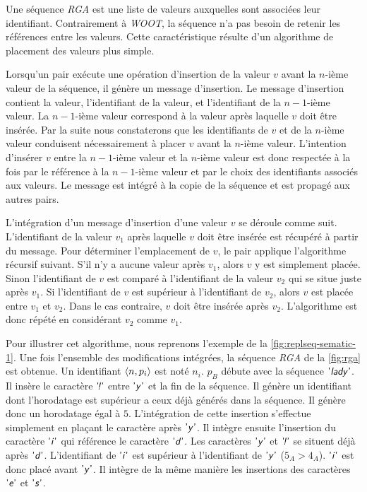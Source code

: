 Une séquence \emph{RGA} est une liste de valeurs auxquelles sont associées leur identifiant.
Contrairement à \emph{WOOT}, la séquence n'a pas besoin de retenir les références entre les valeurs.
Cette caractéristique résulte d'un algorithme de placement des valeurs plus simple.

Lorsqu'un pair exécute une opération d'insertion de la valeur $v$ avant la $n$-ième valeur de la séquence, il génère un message d'insertion.
Le message d'insertion contient la valeur, l'identifiant de la valeur, et l'identifiant de la $n-1$-ième valeur.
La $n-1$-ième valeur correspond à la valeur après laquelle $v$ doit être insérée.
Par la suite nous constaterons que les identifiants de $v$ et de la $n$-ième valeur conduisent nécessairement à placer $v$ avant la $n$-ième valeur.
L'intention d'insérer $v$ entre la $n-1$-ième valeur et la $n$-ième valeur est donc respectée à la fois par le référence à la $n-1$-ième valeur et par le choix des identifiants associés aux valeurs.
Le message est intégré à la copie de la séquence et est propagé aux autres pairs.

L'intégration d'un message d'insertion d'une valeur $v$ se déroule comme suit.
L'identifiant de la valeur $v_1$ après laquelle $v$ doit être insérée est récupéré à partir du message.
Pour déterminer l'emplacement de $v$, le pair applique l'algorithme récursif suivant.
S'il n'y a aucune valeur après $v_1$, alors $v$ y est simplement placée.
Sinon l'identifiant de $v$ est comparé à l'identifiant de la valeur $v_2$ qui se situe juste après $v_1$.
Si l'identifiant de $v$ est supérieur à l'identifiant de $v_2$, alors $v$ est placée entre $v_1$ et $v_2$.
Dans le cas contraire, $v$ doit être insérée après $v_2$.
L'algorithme est donc répété en considérant $v_2$ comme $v_1$.

Pour illustrer cet algorithme, nous reprenons l'exemple de la \autoref{fig:replseq-sematic-1}.
Une fois l'ensemble des modifications intégrées, la séquence \emph{RGA} de la \autoref{fig:rga} est obtenue.
Un identifiant $\tuple*{n, p_i}$ est noté $n_i$.
$p_B$ débute avec la séquence $\textsf{'\textit{lady}'}$.
Il insère le caractère $\textsf{'\textit{\negthinspace!}'}$ entre $\textsf{'\textit{y}'}$ et la fin de la séquence.
Il génère un identifiant dont l'horodatage est supérieur a ceux déjà générés dans la séquence.
Il génère donc un horodatage égal à $5$.
L'intégration de cette insertion s'effectue simplement en plaçant le caractère après $\textsf{'\textit{y}'}$.
Il intègre ensuite l'insertion du caractère $\textsf{'\textit{i}'}$ qui référence le caractère $\textsf{'\textit{d}'}$.
Les caractères $\textsf{'\textit{y}'}$ et $\textsf{'\textit{\negthinspace!}'}$ se situent déjà après $\textsf{'\textit{d}'}$.
L'identifiant de $\textsf{'\textit{i}'}$ est supérieur à l'identifiant de $\textsf{'\textit{y}'}$ ($5_A > 4_A$).
$\textsf{'\textit{i}'}$ est donc placé avant $\textsf{'\textit{y}'}$.
Il intègre de la même manière les insertions des caractères $\textsf{'\textit{e}'}$ et $\textsf{'\textit{s}'}$.


